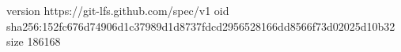 version https://git-lfs.github.com/spec/v1
oid sha256:152fc676d74906d1c37989d1d8737fdcd2956528166dd8566f73d02025d10b32
size 186168
